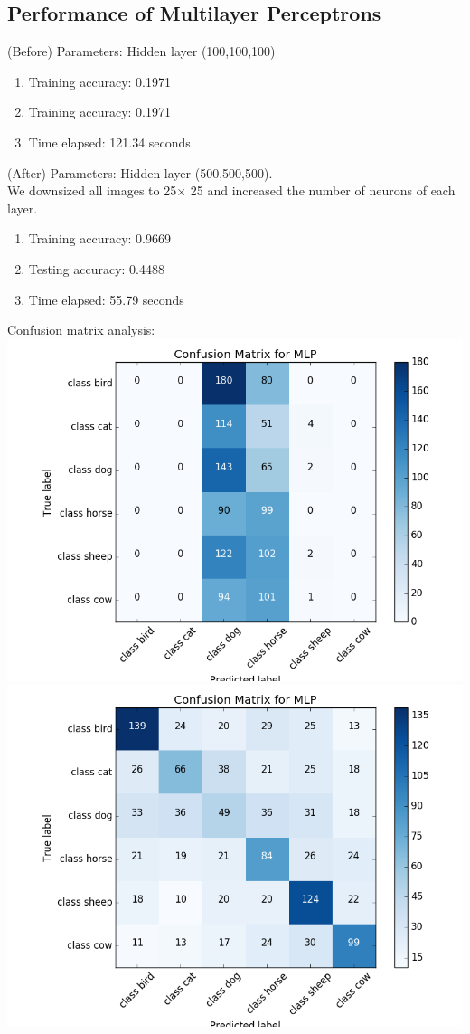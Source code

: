\documentclass{article}
\begin{document}
\subsection{Performance of Multilayer Perceptrons}
(Before) Parameters: Hidden layer (100,100,100) 
\begin{enumerate}
\item Training accuracy: 0.1971
\item Training accuracy: 0.1971
\item Time elapsed: 121.34 seconds 
\end{enumerate}
(After) Parameters: Hidden layer (500,500,500).\\ We downsized all images to 25$ \times $ 25 and increased the number of neurons of each layer. 
\begin{enumerate}
\item Training accuracy: 0.9669
\item Testing accuracy: 0.4488
\item Time elapsed: 55.79 seconds
\end{enumerate}
Confusion matrix analysis: \\
\includegraphics[scale=0.4]{MLP_cm.png}
\includegraphics[scale=0.4]{MLP_cm_new1.png}
\end{document}
